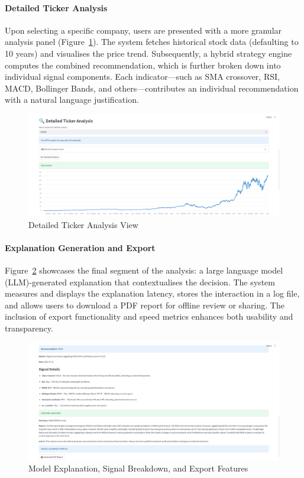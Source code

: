 \paragraph{Detailed Ticker Analysis}
Upon selecting a specific company, users are presented with a more granular analysis panel (Figure~\ref{fig:ui_detailed}). The system fetches historical stock data (defaulting to 10 years) and visualises the price trend. Subsequently, a hybrid strategy engine computes the combined recommendation, which is further broken down into individual signal components. Each indicator—such as SMA crossover, RSI, MACD, Bollinger Bands, and others—contributes an individual recommendation with a natural language justification.

\begin{figure}[h]
\centering
\includegraphics[width=0.9\linewidth]{assets/ui2-ticker_analysis.png}
\caption{Detailed Ticker Analysis View}
\label{fig:ui_detailed}
\end{figure}

\paragraph{Explanation Generation and Export}
Figure~\ref{fig:ui_explanation} showcases the final segment of the analysis: a large language model (LLM)-generated explanation that contextualises the decision. The system measures and displays the explanation latency, stores the interaction in a log file, and allows users to download a PDF report for offline review or sharing. The inclusion of export functionality and speed metrics enhances both usability and transparency.

\begin{figure}[h]
\centering
\includegraphics[width=0.9\linewidth]{assets/ui3-explanation.png}
\caption{Model Explanation, Signal Breakdown, and Export Features}
\label{fig:ui_explanation}
\end{figure}


